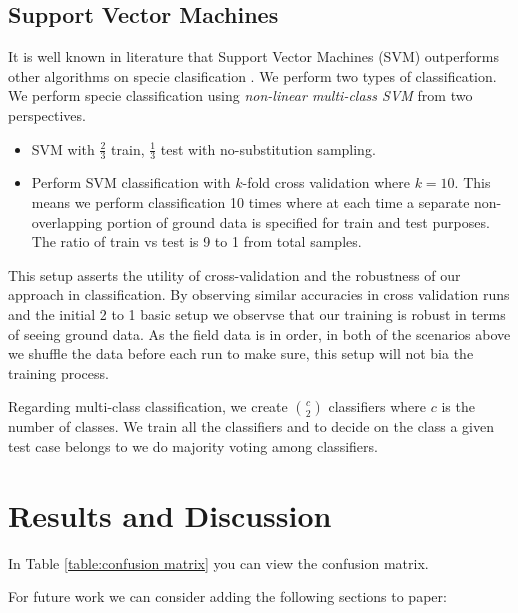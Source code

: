 \documentclass[remotesensing,article,accept,moreauthors,pdftex,12pt,a4paper]{mdpi}
\begin{document}
\subsection{Support Vector Machines}

It is well known in literature that Support Vector Machines (SVM) outperforms other algorithms on specie clasification \cite{colgan2012mapping, baldeck2014landscape, cho2012mapping}. We perform two types of classification. We perform specie classification using \textit{non-linear multi-class SVM} from two perspectives. 


\begin{itemize}
\item SVM with $\frac{2}{3}$ train, $\frac{1}{3}$ test with no-substitution sampling.
\item Perform SVM classification with $k$-fold cross validation where $k=10$. This means we perform classification 10 times where at each time a separate non-overlapping portion of ground data is specified for train and test purposes. The ratio of train vs test is 9 to 1 from total samples.
\end{itemize}

This setup asserts the utility of cross-validation and the robustness of our approach in classification. By observing similar accuracies in cross validation runs and the initial 2 to 1 basic setup we observse that our training is robust in terms of seeing ground data. As the field data is in order, in both of the scenarios above we shuffle the data before each run to make sure, this setup will not bia the training process.

Regarding multi-class classification, we create $\binom{c}{2}$ classifiers where $c$ is the number of classes. We train all the classifiers and to decide on the class a given test case belongs to we do majority voting among classifiers. 



\section{Results and Discussion}

In Table \ref{table:confusion matrix} you can view the confusion matrix.

For future work we can consider adding the following sections to paper: 
\end{document}
